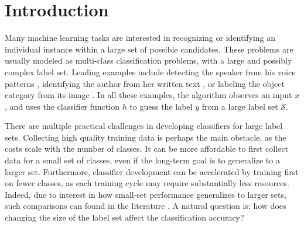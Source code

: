 \documentclass[twoside,11pt]{article}
\begin{document}

\section{Introduction}\label{sec:recog_tasks}

Many machine learning tasks are interested in recognizing or
identifying an individual instance within a large set of possible
candidates. These problems are usually modeled as multi-class
classification problems, with a large and possibly complex label
set. Leading examples include detecting the speaker from his voice
patterns \citep{togneri2011overview}, identifying the author from her
written text \citep{stamatatos2014overview}, or labeling the object
category from its image
\citep{duygulu2002object,deng2010does,oquab2014learning}.  In all
these examples, the algorithm observes an input $x$, and uses the
classifier function $h$ to guess the label $y$ from a large label set
$\mathcal{S}$.

There are multiple practical challenges in developing classifiers for large label sets. Collecting high quality training data is
perhaps the main obstacle, as the costs scale with the number of
classes.  It can be more affordable to first collect data for a small set
of classes, even if the long-term goal is to generalize to a larger
set.  Furthermore, classifier development can be accelerated by
training first on fewer classes, as each training cycle may require
substantially less resources.  Indeed, due to interest in how
small-set performance generalizes to larger sets, such comparisons can
found in the literature \citep{oquab2014learning, griffin2007caltech}.
A natural question is: how does changing the size of the label set
affect the classification accuracy?
\end{document}
